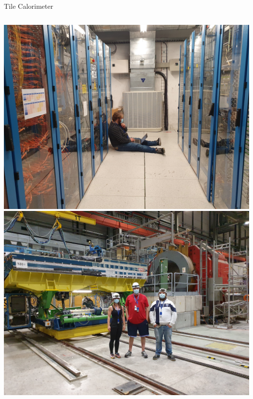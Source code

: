 \documentclass[aspectratio=169,xcolor=table]{beamer}
\begin{document}
\begin{frame}[t]{Tile Calorimeter}
\begin{columns}[t]
        \centering
        \begin{columns}
        \centering
        \includegraphics[height=.33\textheight,keepaspectratio=true]{Hard_At_Work.jpg}
        \includegraphics[height=.33\textheight,keepaspectratio=true]{TileTestBeamSetup_Michaela_Will_Me.jpg}
        \centering

\end{columns}
\end{columns}
\end{frame}
\end{document}

